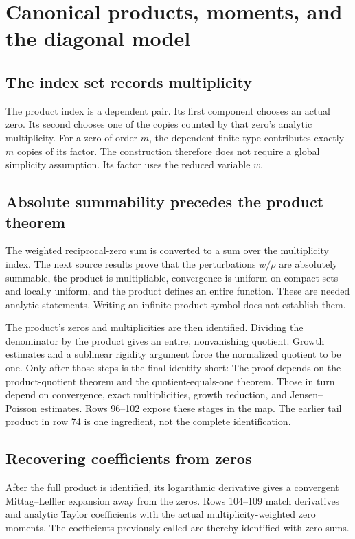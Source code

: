 \section{Canonical products, moments, and the diagonal model}
\subsection{The index set records multiplicity}
The product index is a dependent pair. Its first component chooses an actual zero. Its second chooses one of the copies counted by that zero's analytic multiplicity.
For a zero of order $m$, the dependent finite type contributes exactly $m$ copies of its factor. The construction therefore does not require a global simplicity assumption. Its factor uses the reduced variable $w$.

\subsection{Absolute summability precedes the product theorem}
The weighted reciprocal-zero sum is converted to a sum over the multiplicity index.
The next source results prove that the perturbations $w/\rho$ are absolutely summable, the product is multipliable, convergence is uniform on compact sets and locally uniform, and the product defines an entire function. These are needed analytic statements. Writing an infinite product symbol does not establish them.

The product's zeros and multiplicities are then identified. Dividing the denominator by the product gives an entire, nonvanishing quotient. Growth estimates and a sublinear rigidity argument force the normalized quotient to be one. Only after those steps is the final identity short:
The proof depends on the product-quotient theorem and the quotient-equals-one theorem. Those in turn depend on convergence, exact multiplicities, growth reduction, and Jensen--Poisson estimates. Rows 96--102 expose these stages in the map. The earlier tail product in row 74 is one ingredient, not the complete identification.

\subsection{Recovering coefficients from zeros}
After the full product is identified, its logarithmic derivative gives a convergent Mittag--Leffler expansion away from the zeros. Rows 104--109 match derivatives and analytic Taylor coefficients with the actual multiplicity-weighted zero moments. The coefficients previously called  are thereby identified with zero sums.

